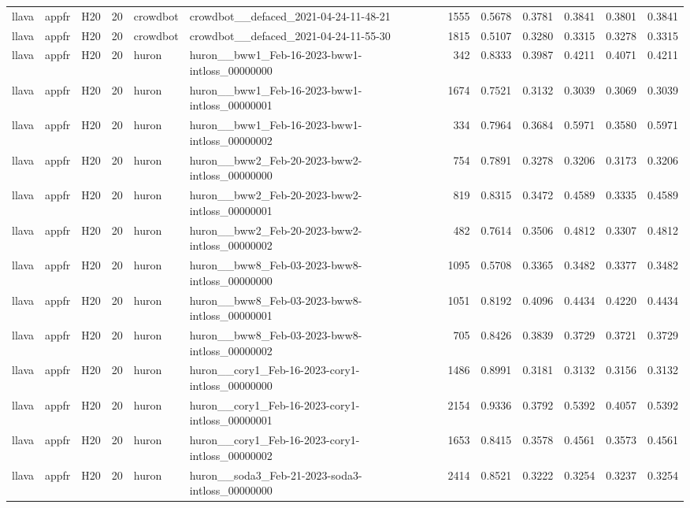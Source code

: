 \begin{table}[tbp]
\begin{tabular}{lllrllrrrrrr}
llava & appfr & H20 & 20 & crowdbot & crowdbot\_\_defaced\_2021-04-24-11-48-21 & 1555 & 0.5678 & 0.3781 & 0.3841 & 0.3801 & 0.3841 \\
llava & appfr & H20 & 20 & crowdbot & crowdbot\_\_defaced\_2021-04-24-11-55-30 & 1815 & 0.5107 & 0.3280 & 0.3315 & 0.3278 & 0.3315 \\
llava & appfr & H20 & 20 & huron & huron\_\_bww1\_Feb-16-2023-bww1-intloss\_00000000 & 342 & 0.8333 & 0.3987 & 0.4211 & 0.4071 & 0.4211 \\
llava & appfr & H20 & 20 & huron & huron\_\_bww1\_Feb-16-2023-bww1-intloss\_00000001 & 1674 & 0.7521 & 0.3132 & 0.3039 & 0.3069 & 0.3039 \\
llava & appfr & H20 & 20 & huron & huron\_\_bww1\_Feb-16-2023-bww1-intloss\_00000002 & 334 & 0.7964 & 0.3684 & 0.5971 & 0.3580 & 0.5971 \\
llava & appfr & H20 & 20 & huron & huron\_\_bww2\_Feb-20-2023-bww2-intloss\_00000000 & 754 & 0.7891 & 0.3278 & 0.3206 & 0.3173 & 0.3206 \\
llava & appfr & H20 & 20 & huron & huron\_\_bww2\_Feb-20-2023-bww2-intloss\_00000001 & 819 & 0.8315 & 0.3472 & 0.4589 & 0.3335 & 0.4589 \\
llava & appfr & H20 & 20 & huron & huron\_\_bww2\_Feb-20-2023-bww2-intloss\_00000002 & 482 & 0.7614 & 0.3506 & 0.4812 & 0.3307 & 0.4812 \\
llava & appfr & H20 & 20 & huron & huron\_\_bww8\_Feb-03-2023-bww8-intloss\_00000000 & 1095 & 0.5708 & 0.3365 & 0.3482 & 0.3377 & 0.3482 \\
llava & appfr & H20 & 20 & huron & huron\_\_bww8\_Feb-03-2023-bww8-intloss\_00000001 & 1051 & 0.8192 & 0.4096 & 0.4434 & 0.4220 & 0.4434 \\
llava & appfr & H20 & 20 & huron & huron\_\_bww8\_Feb-03-2023-bww8-intloss\_00000002 & 705 & 0.8426 & 0.3839 & 0.3729 & 0.3721 & 0.3729 \\
llava & appfr & H20 & 20 & huron & huron\_\_cory1\_Feb-16-2023-cory1-intloss\_00000000 & 1486 & 0.8991 & 0.3181 & 0.3132 & 0.3156 & 0.3132 \\
llava & appfr & H20 & 20 & huron & huron\_\_cory1\_Feb-16-2023-cory1-intloss\_00000001 & 2154 & 0.9336 & 0.3792 & 0.5392 & 0.4057 & 0.5392 \\
llava & appfr & H20 & 20 & huron & huron\_\_cory1\_Feb-16-2023-cory1-intloss\_00000002 & 1653 & 0.8415 & 0.3578 & 0.4561 & 0.3573 & 0.4561 \\
llava & appfr & H20 & 20 & huron & huron\_\_soda3\_Feb-21-2023-soda3-intloss\_00000000 & 2414 & 0.8521 & 0.3222 & 0.3254 & 0.3237 & 0.3254 \\

\end{tabular}
\end{table}
